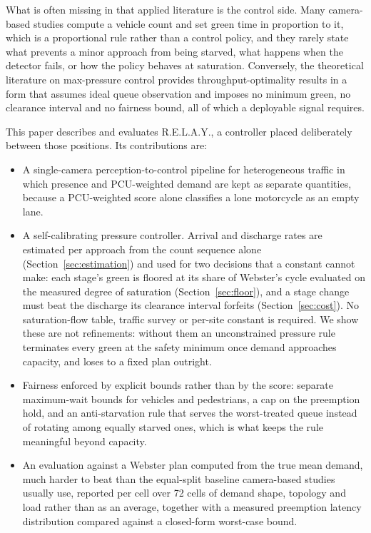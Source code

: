 \documentclass[journal]{IEEEtran}
\newcommand{\relay}{R.E.L.A.Y.}
\newcommand{\pcu}{PCU}
\begin{document}
What is often missing in that applied literature is the control side. Many camera-based studies
compute a vehicle count and set green time in proportion to it, which is a proportional rule rather
than a control policy, and they rarely state what prevents a minor approach from being starved, what
happens when the detector fails, or how the policy behaves at saturation. Conversely, the theoretical
literature on max-pressure control
\cite{Varaiya2013MaxPressure,Varaiya2013MaxPressureChapter} provides throughput-optimality results
in a form that assumes ideal queue observation and imposes no minimum green, no clearance interval and
no fairness bound, all of which a deployable signal requires.

This paper describes and evaluates \relay, a controller placed deliberately between those positions. Its
contributions are:

\begin{itemize}
\item A single-camera perception-to-control pipeline for heterogeneous traffic in which presence and
\pcu-weighted demand are kept as separate quantities, because a \pcu-weighted score alone classifies a
lone motorcycle as an empty lane.

\item A self-calibrating pressure controller. Arrival and discharge rates are estimated per approach
from the count sequence alone (Section~\ref{sec:estimation}) and used for two decisions that a constant
cannot make: each stage's green is floored at its share of Webster's cycle evaluated on the measured
degree of saturation (Section~\ref{sec:floor}), and a stage change must beat the discharge its clearance
interval forfeits (Section~\ref{sec:cost}). No saturation-flow table, traffic survey or per-site constant
is required. We show these are not refinements: without them an unconstrained pressure rule terminates
every green at the safety minimum once demand approaches capacity, and loses to a fixed plan outright.

\item Fairness enforced by explicit bounds rather than by the score: separate maximum-wait bounds for
vehicles and pedestrians, a cap on the preemption hold, and an anti-starvation rule that serves the
worst-treated queue instead of rotating among equally starved ones, which is what keeps the rule
meaningful beyond capacity.

\item An evaluation against a Webster plan computed from the true mean demand, much harder to beat than
the equal-split baseline camera-based studies usually use, reported per cell over 72 cells of demand
shape, topology and load rather than as an average, together with a measured preemption latency
distribution compared against a closed-form worst-case bound.
\end{itemize}
\end{document}
